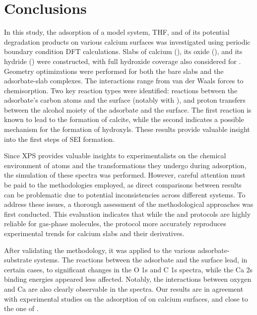 \documentclass[journal=jpccck,manuscript=article]{achemso}
\begin{document}
\section{Conclusions}\label{sec:conclusions}

In this study, the adsorption of a model system, THF, and of its potential degradation products on various calcium surfaces was investigated using periodic boundary condition DFT calculations. Slabs of calcium (), its oxide (), and its hydride () were constructed, with full hydroxide coverage also considered for . Geometry optimizations were performed for both the bare slabs and the adsorbate-slab complexes. The interactions range from van der Waals forces to chemisorption. Two key reaction types were identified: reactions between the adsorbate’s carbon atoms and the surface (notably with ), and proton transfers between the alcohol moiety of the adsorbate and the  surface. The first reaction is known to lead to the formation of calcite\cite{dahleSituPreparationCalcium2012}, while the second indicates a possible mechanism for the formation of hydroxyls. These results provide valuable insight into the first steps of SEI formation.

Since XPS provides valuable insights  to experimentalists on the chemical environment of atoms and the transformations they undergo during adsorption, the simulation of these spectra was performed. However, careful attention must be paid to the methodologies employed, as direct comparisons between results can be problematic due to potential inconsistencies across different systems. To address these issues, a thorough assessment of the methodological approaches was first conducted. This evaluation indicates that while the  and  protocols are highly reliable for gas-phase molecules, the  protocol more accurately reproduces experimental trends for calcium slabs and their derivatives.

After validating the methodology, it was applied to the various adsorbate-substrate systems. The reactions between the adsorbate and the surface lead,  in certain cases, to significant changes in the O 1s and C 1s spectra, while the Ca 2s binding energies appeared less affected. Notably, the interactions between oxygen and Ca are also clearly observable in the spectra. Our results are in agreement with experimental studies on the adsorption of  on calcium surfaces, and close to the one of .\cite{voigtsAdsorptionCO2CO2009}
\end{document}
